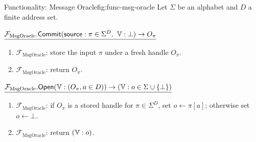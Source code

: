 \begin{protocolbox}{Functionality: Message Oracle}{fig:func-msg-oracle}
Let \(\Sigma\) be an alphabet and \(D\) a finite address set.

\smallskip
\noindent\(\underline{\mathcal F_{\mathrm{MsgOracle}}.\mathsf{Commit}(\mathsf{source}:\pi\in\Sigma^D,\ \verifier:\bot)\to O_\pi}\)

\smallskip
\begin{enumerate}[leftmargin=0.24in,label=\textbf{M\arabic*.},itemsep=0.08em,topsep=0.1em,parsep=0pt]
  \item \(\mathcal F_{\mathrm{MsgOracle}}\): store the input \(\pi\)
        under a fresh handle \(O_\pi\).
  \item \(\mathcal F_{\mathrm{MsgOracle}}\): return \(O_\pi\).
\end{enumerate}

\smallskip
\noindent\(\underline{\mathcal F_{\mathrm{MsgOracle}}.\mathsf{Open}(\mathbb{V}:(O_\pi,a\in D))\to(\mathbb{V}:o\in\Sigma\cup\{\bot\})}\)

\smallskip
\begin{enumerate}[leftmargin=0.24in,label=\textbf{O\arabic*.},itemsep=0.08em,topsep=0.1em,parsep=0pt]
  \item \(\mathcal F_{\mathrm{MsgOracle}}\): if \(O_\pi\) is a stored handle
        for \(\pi\in\Sigma^D\), set \(o\gets\pi[a]\); otherwise set
        \(o\gets\bot\).
  \item \(\mathcal F_{\mathrm{MsgOracle}}\): return \((\mathbb{V}:o)\).
\end{enumerate}
\end{protocolbox}

